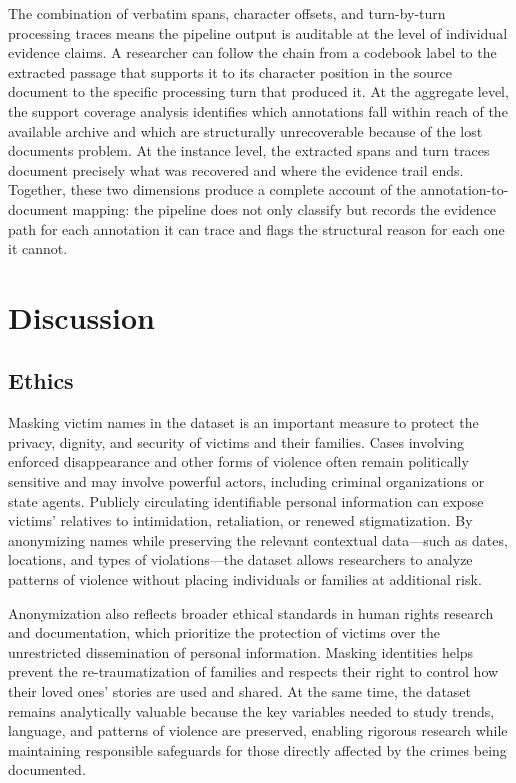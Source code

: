 \documentclass{article}
\begin{document}
The combination of verbatim spans, character offsets, and turn-by-turn processing traces means the pipeline output is auditable at the level of individual evidence claims. A researcher can follow the chain from a codebook label to the extracted passage that supports it to its character position in the source document to the specific processing turn that produced it. At the aggregate level, the support coverage analysis identifies which annotations fall within reach of the available archive and which are structurally unrecoverable because of the lost documents problem. At the instance level, the extracted spans and turn traces document precisely what was recovered and where the evidence trail ends. Together, these two dimensions produce a complete account of the annotation-to-document mapping: the pipeline does not only classify but records the evidence path for each annotation it can trace and flags the structural reason for each one it cannot.

\section{Discussion}\label{discussion}

\subsection{Ethics}\label{ethics}

Masking victim names in the dataset is an important measure to protect the privacy, dignity, and security of victims and their families. Cases involving enforced disappearance and other forms of violence often remain politically sensitive and may involve powerful actors, including criminal organizations or state agents. Publicly circulating identifiable personal information can expose victims’ relatives to intimidation, retaliation, or renewed stigmatization. By anonymizing names while preserving the relevant contextual data—such as dates, locations, and types of violations—the dataset allows researchers to analyze patterns of violence without placing individuals or families at additional risk.

Anonymization also reflects broader ethical standards in human rights research and documentation, which prioritize the protection of victims over the unrestricted dissemination of personal information. Masking identities helps prevent the re-traumatization of families and respects their right to control how their loved ones’ stories are used and shared. At the same time, the dataset remains analytically valuable because the key variables needed to study trends, language, and patterns of violence are preserved, enabling rigorous research while maintaining responsible safeguards for those directly affected by the crimes being documented.
\end{document}
